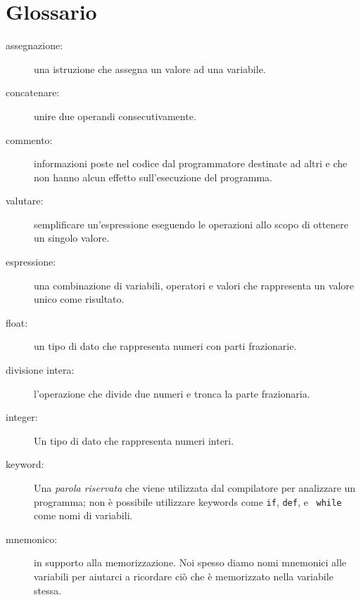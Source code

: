 

\section{Glossario}

\begin{description}

\item[assegnazione:]  una istruzione che assegna un valore ad una variabile.

\item[concatenare:]  unire due operandi consecutivamente.

\item[commento:]  informazioni poste nel codice dal programmatore destinate ad altri e che non hanno alcun effetto sull'esecuzione del programma. 

\item[valutare:]  semplificare un'espressione eseguendo le operazioni allo scopo di ottenere un singolo valore.

\item[espressione:]  una combinazione di variabili, operatori e valori che rappresenta un valore unico come risultato. 

\item[float:] un tipo di dato che rappresenta numeri con parti frazionarie.
   

\item[divisione intera:] l'operazione che divide due numeri e tronca la parte frazionaria. 

\item[integer:] Un tipo di dato che rappresenta numeri interi.  

\item[keyword:]  Una \emph{parola riservata }che viene utilizzata dal compilatore per analizzare un programma; non \`{e} possibile utilizzare keywords come {\tt if}, {\tt  def}, e {\tt
while} come nomi di variabili.  

\item[mnemonico:] in supporto alla memorizzazione. Noi spesso diamo nomi mnemonici alle variabili per aiutarci a ricordare ci\`{o} che \`{e} memorizzato nella variabile stessa.


\end{description}
